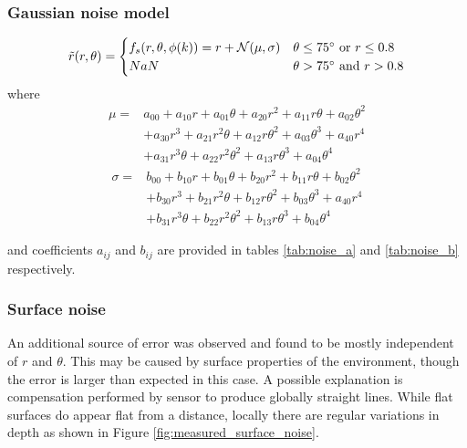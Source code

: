 		\subsubsection{Gaussian noise model}
		\begin{equation}
			\tilde{r}(r,\theta) = 
				\begin{cases}
					\hfill
					f_s(r,\theta,\phi(k)) = r + \mathcal{N}(\mu,\sigma)
						\hfill & \text{$\theta \leq 75^\circ$ or $r \leq 0.8$}\\
					NaN \hfill & \text{$\theta > 75^\circ$ and $r > 0.8$}
				\end{cases} 
		\end{equation}	
		where
		\begin{equation} \label{eq:mean}
			\begin{aligned}
				\mu = & a_{00} + a_{10}r + a_{01}\theta + a_{20}r^2 + a_{11}r\theta + a_{02}\theta^2\\
				      & + a_{30}r^3 + a_{21}r^2\theta + a_{12}r\theta^2 + a_{03}\theta^3 + a_{40}r^4 \\ 
				      & + a_{31}r^3\theta + a_{22}r^2\theta^2 + a_{13}r\theta^3 + a_{04}\theta^4
			\end{aligned}		
		\end{equation}
		\begin{equation} \label{eq:std}
			\begin{aligned}
				\sigma = & b_{00} + b_{10}r + b_{01}\theta + b_{20}r^2 + b_{11}r\theta + b_{02}\theta^2\\
			         	 & + b_{30}r^3 + b_{21}r^2\theta + b_{12}r\theta^2 + b_{03}\theta^3 + a_{40}r^4 \\ 
			         	 & + b_{31}r^3\theta + b_{22}r^2\theta^2 + b_{13}r\theta^3 + b_{04}\theta^4
			\end{aligned}
		\end{equation}
		
		and coefficients $a_{ij}$ and $b_{ij}$ are provided in tables \ref{tab:noise_a} and \ref{tab:noise_b} respectively.
				
					

		\subsubsection{Surface noise}
		An additional source of error was observed and found to be mostly independent of $r$ and $\theta$. This may be caused by surface properties of the environment, though the error is larger than expected in this case. A possible explanation is compensation performed by sensor to produce globally straight lines. While flat surfaces do appear flat from a distance, locally there are regular variations in depth as shown in Figure \ref{fig:measured_surface_noise}. 
		
